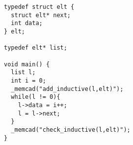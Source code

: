 \begin{verbatim}
typedef struct elt {
  struct elt* next;
  int data;
} elt;

typedef elt* list;

void main() {
  list l;
  int i = 0;
  _memcad("add_inductive(l,elt)");
  while(l != 0){
    l->data = i++;
    l = l->next;
  }
  _memcad("check_inductive(l,elt)");
}
\end{verbatim}
